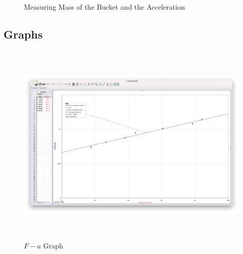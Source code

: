 \documentclass[12pt,a4paper]{article}
\begin{document}
\begin{figure}[h]
    \centering
    \caption{Measuring Mass of the Bucket and the Acceleration}
    \vspace{-0.5cm}
\end{figure}
\subsection{Graphs}
\begin{figure}[H]
    \centering
    \includegraphics[width=15.9cm, height=9.8cm]{F-a.png}
    \caption{$F-a$ Graph}
\end{figure}
\end{document}
